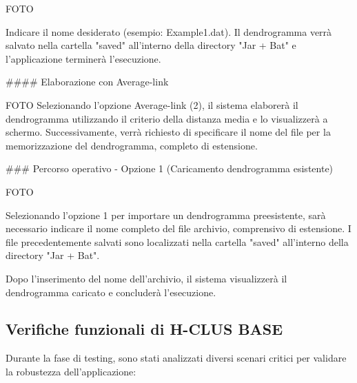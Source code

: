 FOTO 

Indicare il nome desiderato (esempio: Example1.dat). Il dendrogramma verrà salvato nella cartella "saved" all'interno della directory "Jar + Bat" e l'applicazione terminerà l'esecuzione.

#### Elaborazione con Average-link

FOTO 
Selezionando l'opzione Average-link (2), il sistema elaborerà il dendrogramma utilizzando il criterio della distanza media e lo visualizzerà a schermo. Successivamente, verrà richiesto di specificare il nome del file per la memorizzazione del dendrogramma, completo di estensione.

### Percorso operativo - Opzione 1 (Caricamento dendrogramma esistente)

FOTO 

Selezionando l'opzione 1 per importare un dendrogramma preesistente, sarà necessario indicare il nome completo del file archivio, comprensivo di estensione. I file precedentemente salvati sono localizzati nella cartella "saved" all'interno della directory "Jar + Bat".

Dopo l'inserimento del nome dell'archivio, il sistema visualizzerà il dendrogramma caricato e concluderà l'esecuzione.


\subsection{Verifiche funzionali di H-CLUS BASE}

Durante la fase di testing, sono stati analizzati diversi scenari critici per validare la robustezza dell'applicazione:

